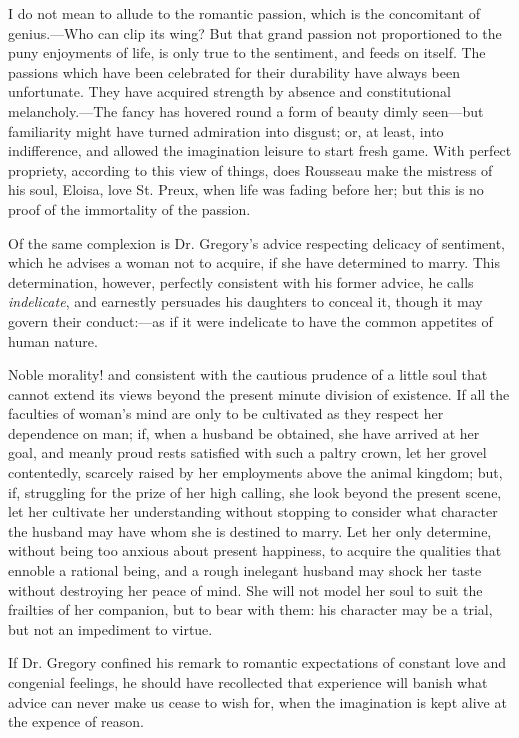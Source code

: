 I do not mean to allude to the romantic passion, which is the
concomitant of genius.---Who can clip its wing? But that grand passion
not proportioned to the puny enjoyments of life, is only true to the
sentiment, and feeds on itself. The passions which have been
celebrated for their durability have always been unfortunate. They
have acquired strength by absence and constitutional melancholy.---The
fancy has hovered round a form of beauty dimly seen---but familiarity
might have turned admiration into disgust; or, at least, into
indifference, and allowed the imagination leisure to start fresh game.
With perfect propriety, according to this view of things, does
Rousseau make the mistress of his soul, Eloisa, love St. Preux, when
life was fading before her; but this is no proof of the immortality of
the passion.

Of the same complexion is Dr. Gregory's advice respecting delicacy of
sentiment, which he advises a woman not to acquire, if she have
determined to marry. This determination,  however, perfectly
consistent with his former advice, he calls \textit{indelicate}, and
earnestly persuades his daughters to conceal it, though it may govern
their conduct:---as if it were indelicate to have the common appetites
of human nature.

Noble morality! and consistent with the cautious prudence of a little
soul that cannot extend its views beyond the present minute division
of existence. If all the faculties of woman's mind are only to be
cultivated as they respect her dependence on man; if, when a husband
be obtained, she have arrived at her goal, and meanly proud rests
satisfied with such a paltry crown, let her grovel contentedly,
scarcely raised by her employments above the animal kingdom; but, if,
struggling for the prize of her high calling, she look beyond the
present scene, let her cultivate her understanding without stopping to
consider what character the husband may have whom she is destined to
marry. Let her only determine, without being too anxious about present
happiness, to acquire the qualities that ennoble a rational being, and
a rough inelegant husband may shock her taste without destroying her
peace of mind. She will not model her soul to suit  the
frailties of her companion, but to bear with them: his character may
be a trial, but not an impediment to virtue.

If Dr. Gregory confined his remark to romantic expectations of
constant love and congenial feelings, he should have recollected that
experience will banish what advice can never make us cease to wish
for, when the imagination is kept alive at the expence of reason.

